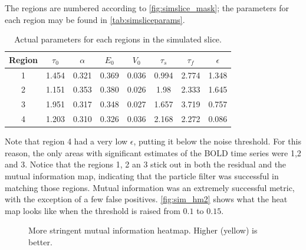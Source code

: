 The regions are numbered according to \autoref{fig:simslice_mask}; the parameters
for each region may be found in \autoref{tab:simsliceparams}.

\begin{table}[t]
\centering
\begin{tabular}{|c |c | c | c | c | c | c | c |}
\hline
Region & $\tau_0$ & $\alpha$ & $E_0$    & $V_0$    & $\tau_s$ & $\tau_f$ & $\epsilon$  \\
\hline
1 & 1.454& 0.321& 0.369& 0.036& 0.994& 2.774& 1.348\\
2 &1.151&  0.353& 0.380& 0.026& 1.98&  2.333& 1.645 \\
3 &1.951&  0.317& 0.348& 0.027& 1.657& 3.719& 0.757 \\
4 &1.203 & 0.310& 0.326& 0.036& 2.168& 2.272& 0.086\\
\hline
\end{tabular}
\caption{Actual parameters for each regions in the simulated slice.}
\label{tab:simsliceparams}
\end{table}

Note that region 4 had a very low $\epsilon$, putting it below the noise
threshold. For this reason, the only areas
with significant estimates of the BOLD time series were 1,2 and 3.
Notice that the
regions 1, 2 an 3 stick out in both the residual and the mutual information
map, indicating that the particle filter was successful in matching those regions.
Mutual information was an extremely successful metric, with the exception of
a few false positives. \autoref{fig:sim_hm2} shows what the heat map looks
like when the threshold is raised from $0.1$ to $0.15$.
\begin{figure}
\centering
{}
\caption{More stringent mutual information heatmap. Higher (yellow) is better.}
\label{fig:sim_hm2}
\end{figure}

